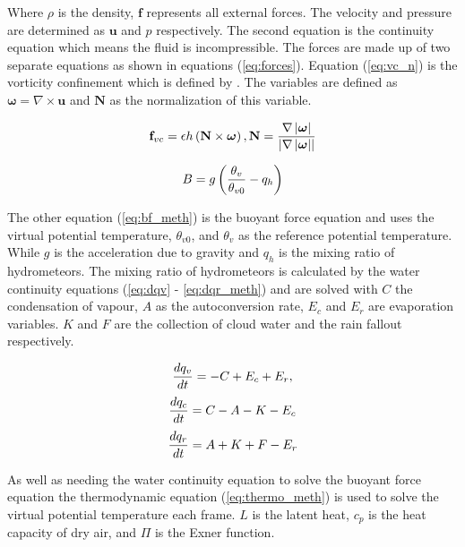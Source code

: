 Where $\rho$ is the density, $\mathbf{f}$ represents all external forces.
The velocity and pressure are determined as $\mathbf{u}$ and $p$ respectively.
The second equation is the continuity equation which means the fluid is incompressible.
The forces are made up of two separate equations as shown in equations (\ref{eq:forces}).
Equation (\ref{eq:vc_n}) is the vorticity confinement which is defined by \citet{HarrisEtAl03}.
The variables are defined as $\boldsymbol{\omega} = \nabla\times\mathbf{u}$ and $\mathbf{N}$ as the normalization of this variable. 

\begin{equation} \label{eq:vc_n}
  \centering
  \mathbf{f}_{vc} = \epsilon h\left(\mathbf{N}\times\boldsymbol{\omega}\right), \mathbf{N} = \frac{\nabla\left|\boldsymbol{\omega}\right|}{\left|\nabla\left|\boldsymbol{\omega}\right|\right|}
\end{equation}

\begin{equation} \label{eq:bf_meth}
  \centering
  B = g\left(\frac{\theta_{v}}{\theta_{v0}} - q_{h}\right)
\end{equation}

The other equation (\ref{eq:bf_meth}) is the buoyant force equation and uses the virtual potential temperature, $\theta_{v0}$, and $\theta_{v}$ as the reference potential temperature.
While $g$ is the acceleration due to gravity and $q_{h}$ is the mixing ratio of hydrometeors.
The mixing ratio of hydrometeors is calculated by the water continuity equations (\ref{eq:dqv} - \ref{eq:dqr_meth}) and are solved with $C$ the condensation of vapour, $A$ as the autoconversion rate, $E_{c}$ and $E_{r}$ are evaporation variables.
$K$ and $F$ are the collection of cloud water and the rain fallout respectively.

\begin{equation} \label{eq:dqv_meth}
  \centering
  \frac{dq_{v}}{dt} = - C + E_{c} + E_{r}, 
\end{equation}
\begin{equation} \label{eq:dqc_meth}
  \centering
  \frac{dq_{c}}{dt} = C - A - K - E_{c}
\end{equation}
\begin{equation} \label{eq:dqr_meth}
  \centering
  \frac{dq_{r}}{dt} = A + K + F - E_{r}
\end{equation}

As well as needing the water continuity equation to solve the buoyant force equation the thermodynamic equation (\ref{eq:thermo_meth}) is used to solve the virtual potential temperature each frame. $L$ is the latent heat, $c_{p}$ is the heat capacity of dry air, and $\Pi$ is the Exner function. 


